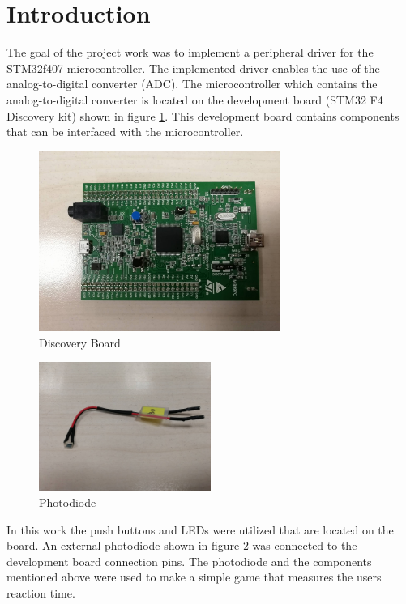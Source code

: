 \section{Introduction}
The goal of the project work was to implement a peripheral driver for the STM32f407 microcontroller. The implemented driver enables the use of the analog-to-digital converter (ADC). The microcontroller which contains the analog-to-digital converter is located on the development board (STM32 F4 Discovery kit) shown in figure \ref{fig:Board}. This development board contains components that can be interfaced with the microcontroller.\\

\begin{figure}[htbp]
  \centering
     \includegraphics[width=0.7\textwidth]{./figures/board.jpg}
  \caption{Discovery Board}
  \label{fig:Board}
\end{figure}

\begin{figure}[htbp]
  \centering
     \includegraphics[width=0.5\textwidth]{./figures/photodiode.jpg}
  \caption{Photodiode}
  \label{fig:photodiode}
\end{figure}

\par
In this work the push buttons and LEDs were utilized that are located on the board. An external photodiode shown in figure \ref{fig:photodiode} was connected to the development board connection pins. The photodiode and the components mentioned above were used to make a simple game that measures the users reaction time.

